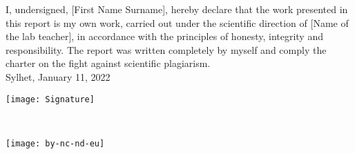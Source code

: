 \iftrue %
    I, undersigned, [First Name Surname], %
    hereby declare that the work presented in this report is my own work, carried out under the scientific direction of [Name of the lab teacher], %
    in accordance with the principles of honesty, integrity and responsibility. The report was written completely by myself and comply the charter on the fight against scientific plagiarism.\\
    
    Sylhet,  January 11, 2022
    
    \begin{flushright}\texttt{[image: Signature]}\end{flushright}%
\fi

\iffalse %
     I, undersigned, [First Name Surname], %
    hereby declare that the work presented in this report is my own work, carried out under the scientific direction of [Name of the lab teacher], %
    in accordance with the principles of honesty, integrity and responsibility. The report was written completely by myself and comply the charter on the fight against scientific plagiarism.\\
    
    Sylhet,  January 11, 2022
    
    \begin{flushright}\texttt{[image: Signature]}\end{flushright}%
\fi

~\vfill
\begin{center}
	\begin{minipage}[c]{0.25\linewidth}
		\texttt{[image: by-nc-nd-eu]}
	\end{minipage}\hfill
\end{center}


\newpage
